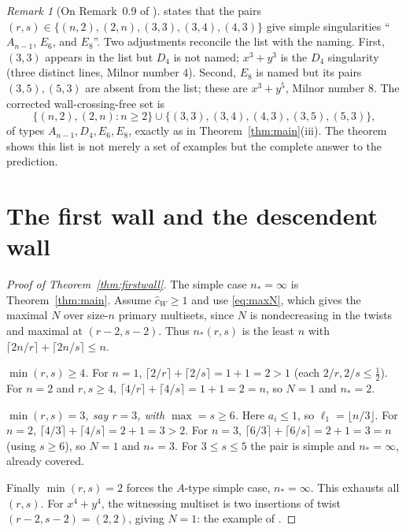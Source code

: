 \documentclass[11pt]{amsart}
\theoremstyle{definition}
\theoremstyle{remark}
\newtheorem{remark}[theorem]{Remark}
\newcommand{\chat}{\hat{c}}
\begin{document}
\begin{remark}[On Remark~0.9 of \cite{GKT}]
\label{rem:erratum}
\cite[Remark~0.9]{GKT} states that the pairs
$(r,s)\in\{(n,2),(2,n),(3,3),(3,4),(4,3)\}$ give simple singularities
``$A_{n-1}$, $E_{6}$, and $E_{8}$''. Two adjustments reconcile the list with the
naming. First, $(3,3)$ appears in the list but $D_{4}$ is not named; $x^{3}+y^{3}$
is the $D_{4}$ singularity (three distinct lines, Milnor number $4$). Second,
$E_{8}$ is named but its pairs $(3,5),(5,3)$ are absent from the list; these are
$x^{3}+y^{5}$, Milnor number $8$. The corrected wall-crossing-free set is
\[
\{(n,2),(2,n):n\geq2\}\cup\{(3,3),(3,4),(4,3),(3,5),(5,3)\},
\]
of types $A_{n-1},D_{4},E_{6},E_{8}$, exactly as in Theorem~\ref{thm:main}(iii).
The theorem shows this list is not merely a set of examples but the complete
answer to the prediction.
\end{remark}

\section{The first wall and the descendent wall}
\label{sec:firstwall}

\begin{proof}[Proof of Theorem~\ref{thm:firstwall}]
The simple case $n_{*}=\infty$ is Theorem~\ref{thm:main}. Assume $\chat_{W}\geq1$
and use \eqref{eq:maxN}, which gives the maximal $N$ over size-$n$ primary
multisets, since $N$ is nondecreasing in the twists and maximal at
$(r-2,s-2)$. Thus $n_{*}(r,s)$ is the least $n$ with
$\lceil2n/r\rceil+\lceil2n/s\rceil\leq n$.

\emph{$\min(r,s)\geq4$.} For $n=1$, $\lceil2/r\rceil+\lceil2/s\rceil=1+1=2>1$
(each $2/r,2/s\leq\frac12$). For $n=2$ and $r,s\geq4$,
$\lceil4/r\rceil+\lceil4/s\rceil=1+1=2=n$, so $N=1$ and $n_{*}=2$.

\emph{$\min(r,s)=3$, say $r=3$, with $\max=s\geq6$.} Here $a_{i}\leq1$, so
$\ell_{1}=\lfloor n/3\rfloor$. For $n=2$,
$\lceil4/3\rceil+\lceil4/s\rceil=2+1=3>2$. For $n=3$,
$\lceil6/3\rceil+\lceil6/s\rceil=2+1=3=n$ (using $s\geq6$), so $N=1$ and
$n_{*}=3$. For $3\le s\le5$ the pair is simple and $n_{*}=\infty$, already
covered.

Finally $\min(r,s)=2$ forces the $A$-type simple case, $n_{*}=\infty$. This
exhausts all $(r,s)$. For $x^{4}+y^{4}$, the witnessing multiset is two
insertions of twist $(r-2,s-2)=(2,2)$, giving $N=1$: the example of
\cite[\S6]{GKTsurvey}.
\end{proof}
\end{document}
